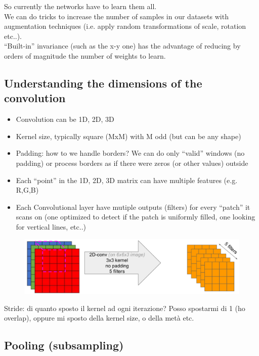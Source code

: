So currently the networks have to learn them all.\\
We can do tricks to increase the number of samples in our datasets with augmentation techniques (i.e. apply random transformations of scale, rotation etc..).\\
“Built-in” invariance (such as the x-y one) has the advantage of reducing by orders of magnitude the number of weights to learn.

\subsection{Understanding the dimensions of the convolution}

\begin{itemize}
	\item Convolution can be 1D, 2D, 3D
	\item Kernel size, typically square (MxM) with M odd (but can be any shape)
	\item Padding: how to we handle borders? We can do only “valid” windows (no padding) or process borders as if there were zeros (or other values) outside
	\item Each “point” in the 1D, 2D, 3D matrix can have multiple features (e.g. R,G,B)
	\item Each Convolutional layer have mutiple outputs (filters) for every “patch” it scans on (one optimized to detect if the patch is uniformly filled, one looking for vertical lines, etc..)
\end{itemize}

\begin{figure}[ht]
	\centering
	\includegraphics[width=0.8\linewidth]{figure_ml/convolution.png}
\end{figure}
\FloatBarrier

Stride: di quanto sposto il kernel ad ogni iterazione? Posso spostarmi di 1 (ho overlap), oppure mi sposto della kernel size, o della metà etc.




\subsection{Pooling (subsampling)}

